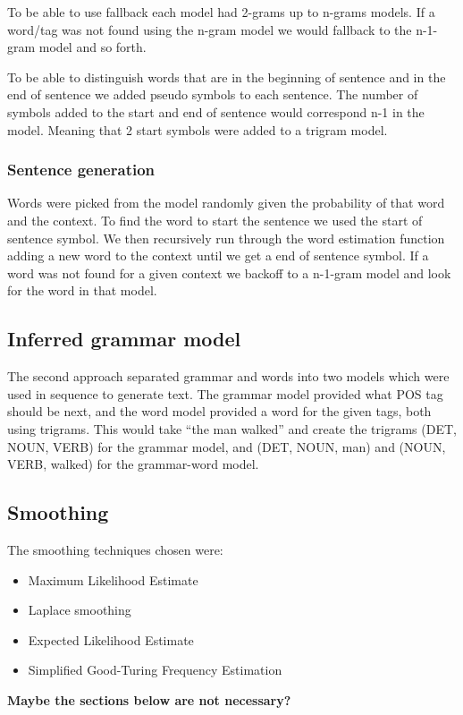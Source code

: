 \documentclass[a4paper,12pt]{article}
\begin{document}
To be able to use fallback each model had 2-grams up to n-grams models. If a word/tag was not found using the n-gram model we would fallback to the n-1-gram model and so forth.

To be able to distinguish words that are in the beginning of sentence and in the end of sentence we added pseudo symbols to each sentence. The number of symbols added to the start and end of sentence would correspond n-1 in the model. Meaning that 2 start symbols were added to a trigram model.

\subsubsection{Sentence generation}
Words were picked from the model randomly given the probability of that word and the context. To find the word to start the sentence we used the start of sentence symbol. We then recursively run through the word estimation function adding a new word to the context until we get a end of sentence symbol. If a word was not found for a given context we backoff to a n-1-gram model and look for the word in that model.

\subsection{Inferred grammar model}
The second approach separated grammar and words into two models which were used in sequence to generate text. The grammar model provided what POS tag should be next, and the word model provided a word for the given tags, both using trigrams. This would take ``the man walked'' and create the trigrams (DET, NOUN, VERB) for the grammar model, and (DET, NOUN, man) and (NOUN, VERB, walked) for the grammar-word model.

\subsection{Smoothing}
The smoothing techniques chosen were:
\begin{itemize}
\item Maximum Likelihood Estimate
\item Laplace smoothing
\item Expected Likelihood Estimate
\item Simplified Good-Turing Frequency Estimation
\end{itemize}

\textbf{Maybe the sections below are not necessary?}
\end{document}
